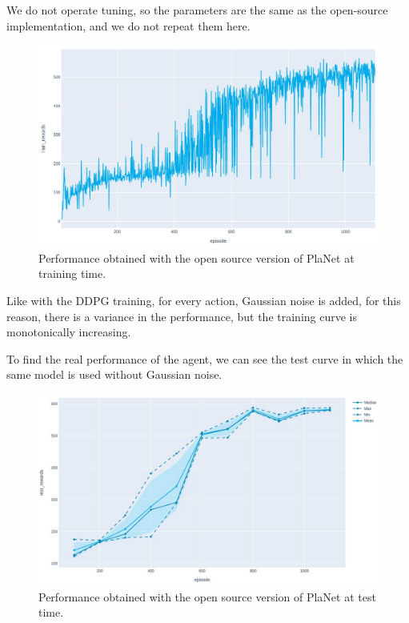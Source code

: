 We do not operate tuning, so the parameters are the same as the open-source implementation, and we do not repeat them here.

\begin{figure}[H]
\centering
\includegraphics[width=1. \textwidth, height=.3\textheight]{pictures/train_resize}
\caption{ Performance obtained with the open source version of PlaNet at training time.}
\end{figure}

Like with the DDPG training, for every action, Gaussian noise is added, for this reason, there is a variance in the performance, but the training curve is monotonically increasing.

To find the real performance of the agent, we can see the test curve in which the same model is used without Gaussian noise.

\begin{figure}[H]
\centering
\includegraphics[width=1. \textwidth, height=.3\textheight]{pictures/test_resize}
\caption{ Performance obtained with the open source version of PlaNet at test time.}
\end{figure}


